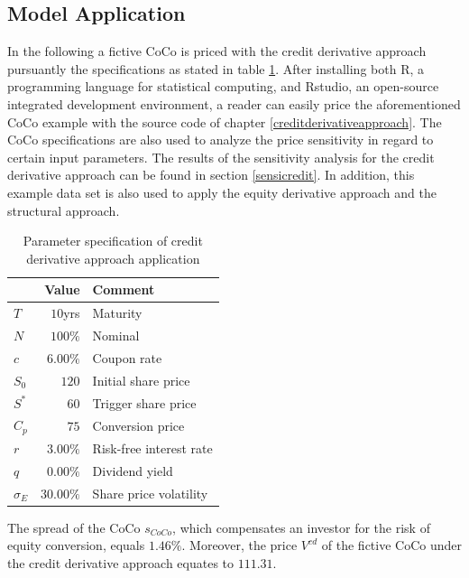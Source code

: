 \subsection{Model Application}

In the following a fictive CoCo is priced with the credit derivative approach pursuantly the specifications as stated in table \ref{creditcoco}. After installing both R, a programming language for statistical computing, and Rstudio, an open-source integrated development environment, a reader can easily price the aforementioned CoCo example with the source code of chapter \ref{creditderivativeapproach}. The CoCo specifications are also used to analyze the price sensitivity in regard to certain input parameters. The results of the sensitivity analysis for the credit derivative approach can be found in section \ref{sensicredit}. In addition, this example data set is also used to apply the equity derivative approach and the structural approach.

\begin{table}[H]
	\setlength{\extrarowheight}{2.5pt}
	\centering
	\begin{tabular}{lrl}
		\toprule
			 & \textbf{Value} & \textbf{Comment} \\
		\midrule
			$T$ & $10$yrs & Maturity \\
			$N$ & $100\%$ & Nominal \\			
			$c$ & $6.00\%$ & Coupon rate \\
			$S_0$ & $120$ & Initial share price\\
			$S^*$ & $60$ & Trigger share price \\
			$C_p$ & $75$ & Conversion price \\
			$r$ & $3.00 \%$ & Risk-free interest rate\\
			$q$ & $0.00\%$ & Dividend yield \\
			$\sigma_E$ & $30.00\%$ & Share price volatility \\
		\bottomrule
	\end{tabular}
	\caption[Parameter specification of credit derivative approach application]{Parameter specification of credit derivative approach application \citep{alvemar2012modelling}}
	\label{creditcoco}
\end{table}

The spread of the CoCo $s_{CoCo}$, which compensates an investor for the risk of equity conversion, equals $1.46\%$. Moreover,  the price $V^{cd}$ of the fictive CoCo under the credit derivative approach equates to $111.31$.

